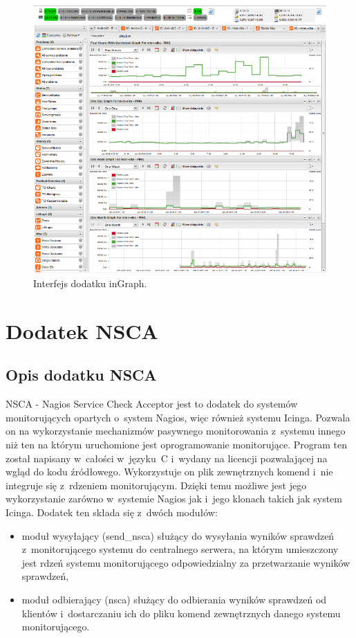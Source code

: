\begin{figure}[h]
  \caption{Interfejs dodatku inGraph.}
  \label{fig:inGraph}
\includegraphics[width=1\textwidth]{img/ingraph.png}
\end{figure}


\section[Dodatek NSCA][Dodatek NSCA]{Dodatek NSCA}
\label{sec:NSCA}

\subsection[Opis dodatku NSCA][Opis dodatku NSCA]{Opis dodatku NSCA}

NSCA - Nagios Service Check Acceptor jest to dodatek do systemów
monitorujących opartych o~system Nagios, więc również systemu
Icinga. Pozwala on na wykorzystanie mechanizmów pasywnego
monitorowania z~systemu innego niż ten na którym uruchomione jest
oprogramowanie monitorujące. Program ten został napisany w~całości
w~języku~C i~wydany na licencji pozwalającej na wgląd do kodu
źródłowego. Wykorzystuje on plik zewnętrznych komend i~nie integruje
się z~rdzeniem monitorującym. Dzięki temu możliwe jest jego
wykorzystanie zarówno w~systemie Nagios jak i~jego klonach takich jak
system Icinga. Dodatek ten składa się z~dwóch modułów:

\begin{itemize}
\item moduł wysyłający (send\_nsca) służący do wysyłania wyników
  sprawdzeń z~monitorującego systemu do centralnego serwera, na którym
  umieszczony jest rdzeń systemu monitorującego odpowiedzialny za
  przetwarzanie wyników sprawdzeń,
\item moduł odbierający (nsca) służący do odbierania wyników sprawdzeń
  od klientów i~dostarczaniu ich do pliku komend zewnętrznych danego
  systemu monitorującego.
\end{itemize}

